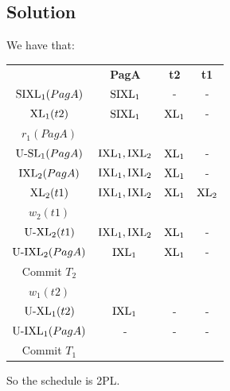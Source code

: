 \documentclass[12pt, a4paper]{report}
\newtheorem[style=M,bodystyle=\normalfont]{theorem}{Theorem}
\newtheorem[style=M,bodystyle=\normalfont]{corollary}{Corollary}
\newtheorem[style=M,bodystyle=\normalfont]{lemma}{Lemma}
\newtheorem[style=M,bodystyle=\normalfont]{definition}{Definition}
\begin{document}
    \subsection*{Solution}
        We have that: 
        \begin{table}[H]
            \centering
            \begin{tabular}{c|ccc|}
            \cline{2-4}
            \textit{}                    & \textbf{PagA}                           & \textbf{t2}          & \textbf{t1}           \\ \cline{2-4} 
            $\textnormal{SIXL}_1(PagA)$  & $\textnormal{SIXL}_1$                   & -                    & -                     \\
            $\textnormal{XL}_1(t2)$      & $\textnormal{SIXL}_1$                   & $\textnormal{XL}_1$  & -                     \\
            $r_1(PagA)$                  &                                         &                      &                       \\
            $\textnormal{U-SL}_1(PagA)$  & $\textnormal{IXL}_1,\textnormal{IXL}_2$ & $\textnormal{XL}_1$  & -                     \\
            $\textnormal{IXL}_2(PagA)$   & $\textnormal{IXL}_1,\textnormal{IXL}_2$ & $\textnormal{XL}_1$  & -                     \\
            $\textnormal{XL}_2(t1)$      & $\textnormal{IXL}_1,\textnormal{IXL}_2$ & $\textnormal{XL}_1$  & $\textnormal{XL}_2$   \\
            $w_2(t1)$                    &                                         &                      &                       \\
            $\textnormal{U-XL}_2(t1)$    & $\textnormal{IXL}_1,\textnormal{IXL}_2$ & $\textnormal{XL}_1$  & -                     \\
            $\textnormal{U-IXL}_2(PagA)$ & $\textnormal{IXL}_1$                    & $\textnormal{XL}_1$  & -                     \\
            Commit $T_2$                 &                                         &                      &                       \\
            $w_1(t2)$                    &                                         &                      &                       \\
            $\textnormal{U-XL}_1(t2)$    & $\textnormal{IXL}_1$                    & -                    & -                     \\
            $\textnormal{U-IXL}_1(PagA)$ & -                                       & -                    & -                     \\
            Commit $T_1$                 & \multicolumn{1}{l}{}                    & \multicolumn{1}{l}{} & \multicolumn{1}{l|}{} \\ \cline{2-4} 
            \end{tabular}
        \end{table}
        So the schedule is 2PL.
\end{document}
